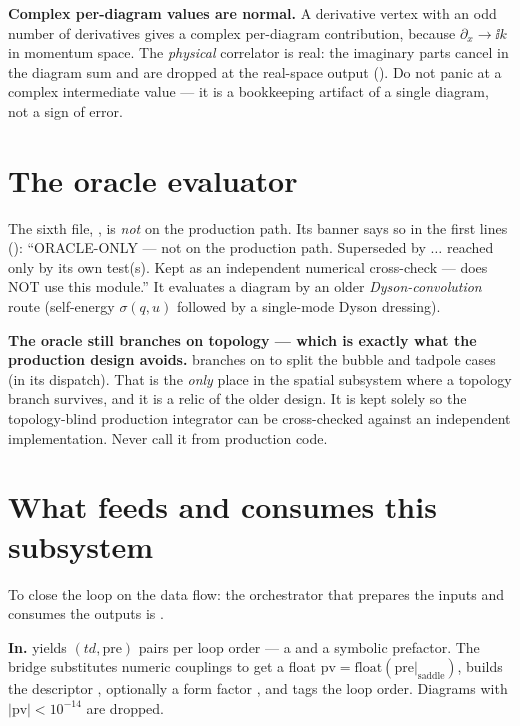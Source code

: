 \begin{gotcha}
\textbf{Complex per-diagram values are normal.} A derivative vertex with an odd
number of derivatives gives a complex per-diagram contribution, because
$\partial_x\to\ii k$ in momentum space. The \emph{physical} correlator is real:
the imaginary parts cancel in the diagram sum and are dropped at the real-space
output (). Do not panic at a complex
intermediate value --- it is a bookkeeping artifact of a single diagram, not a
sign of error.
\end{gotcha}

\section{The oracle evaluator}

The sixth file, , is \emph{not} on the production
path. Its banner says so in the first lines ():
``ORACLE-ONLY --- not on the production path. Superseded by
 $\dots$ reached only by its own test(s). Kept as an
independent numerical cross-check ---  does NOT use this
module.'' It evaluates a diagram by an older \emph{Dyson-convolution} route
(self-energy $\sigma(q,u)$ followed by a single-mode Dyson dressing).

\begin{gotcha}
\textbf{The oracle still branches on topology --- which is exactly what the
production design avoids.}  branches on
 to split the bubble and tadpole cases (in its
 dispatch). That is the \emph{only} place in the spatial
subsystem where a topology branch survives, and it is a relic of the older design.
It is kept solely so the topology-blind production integrator can be cross-checked
against an independent implementation. Never call it from production code.
\end{gotcha}

\section{What feeds and consumes this subsystem}

To close the loop on the data flow: the orchestrator that prepares the inputs and
consumes the outputs is .

\textbf{In.}  yields $(td,\text{pre})$ pairs per
loop order --- a  and a symbolic prefactor. The bridge
substitutes numeric couplings to get a float
$\text{pv} = \text{float}(\text{pre}\big|_{\text{saddle}})$, builds the descriptor
, optionally a form factor , and tags
the loop order. Diagrams with $|\text{pv}| < 10^{-14}$ are dropped.

